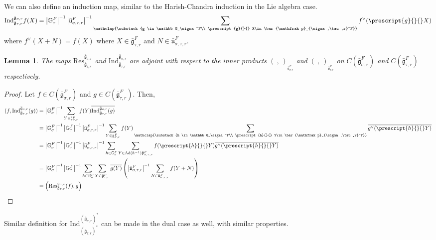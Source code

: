 \documentclass[11 pt]{article}
\numberwithin{equation}{subsection}
\newtheorem{lemma}[theorem]{Lemma}
\theoremstyle{definition}
\theoremstyle{remark}
\theoremstyle{conjecture}
\newcommand{\bg}{\bar{\mathfrak g}}
\newcommand{\bu}{\bar{\mathfrak u}}
\newcommand{\bp}{\bar{\mathfrak p}}
\newcommand{\Res}{\mathrm{Res}}
\newcommand{\Ind}{\mathrm{Ind}}
\newcommand{\Ad}{\mathrm{Ad}}
\newcommand{\G}{\mathbb G}
\begin{document}
\par
We can also define an induction map, similar to the Harish-Chandra induction in the Lie algebra case. 
\begin{equation*}
    \Ind^{\bg_{\sigma,r}}_{\bg_{\tau,r}}f(X)= \left|\G_\tau^F\right|^{-1}\left|\bu_{\sigma,\tau,r}^F\right|^{-1}\sum_{{\mathclap{\substack{g \in \G_\sigma^F\\ \prescript{g}{}{} X\in \bp_{\sigma,\tau,r}^F}}}}f^\vee(\prescript{g}{}{} X)
\end{equation*}
where $f^\vee (X+N)= f(X)$ where $X \in \bg^F_{\tau,r}$ and $N\in \bu_{\sigma,\tau,r}^F$. 

\begin{lemma}\label{indandres}
    The maps $ \Res^{\bg_{\sigma,r}}_{\bg_{\tau,r}}$ and $\Ind^{\bg_{\sigma,r}}_{\bg_{\tau,r}}$ are adjoint with respect to the inner products $(\:,\:)_{_{\bg_{\sigma,r}^F}}$ and $(\:,\:)_{_{\bg_{\tau,r}^F}} $ on $C(\bg_{\sigma,r}^F)$ and $C(\bg_{\tau,r}^F)$ respectively.
\end{lemma}
\begin{proof}
    Let $f \in C(\bg_{\sigma,r}^F)$ and $g \in C(\bg_{\tau,r}^F)$. Then, 
    \begin{align*}
        (f,\Ind^{\bg_{\sigma,r}}_{\bg_{\tau,r}}(g))&=\left|\G_{\sigma}^F\right|^{-1}\sum_{Y\in \bg_{\sigma,r}^F}f(Y)\overline{\Ind^{\bg_{\sigma,r}}_{\bg_{\tau,r}}(g)}\\
        &= \left|\G_{\sigma}^F\right|^{-1}\left|\G_\tau^F\right|^{-1}\left|\bu_{\sigma,\tau,r}^F\right|^{-1}\sum_{Y\in \bg_{\sigma,r}^F}f(Y)\sum_{{\mathclap{\substack{h \in \G_\sigma^F\\ \prescript{h}{}{} Y\in \bp_{\sigma,\tau,r}^F}}}}\overline{g^\vee(\prescript{h}{}{} Y)}\\
        &=\left|\G_{\sigma}^F\right|^{-1}\left|\G_\tau^F\right|^{-1}\left|\bu_{\sigma,\tau,r}^F\right|^{-1}\sum_{h \in \G_\sigma^F} \sum_{Y\in \Ad(h^{-1})\bp_{\sigma,\tau,r}^F}f(\prescript{h}{}{} Y)\overline{g^\vee(\prescript{h}{}{} Y)}\\
        &=\left|\G_{\sigma}^F\right|^{-1}\left|\G_\tau^F\right|^{-1}\sum_{h \in \G_\sigma^F} \sum_{Y \in \bg_{\tau,r}^F} \overline{g(Y)}\left(\left|\bu_{\sigma,\tau,r}^F\right|^{-1} \sum_{N\in \bu_{\sigma,\tau,r}^F}f(Y+N)\right)\\
        &= \left(\Res^{\bg_{\sigma,r}}_{\bg_{\tau,r}}(f), g\right)
    \end{align*}
\end{proof}
Similar definition for $\Ind^{(\bg_{\sigma,r})^*}_{(\bg_{\tau,r})^*}$ can be made in the dual case as well, with similar properties. 
\end{document}
